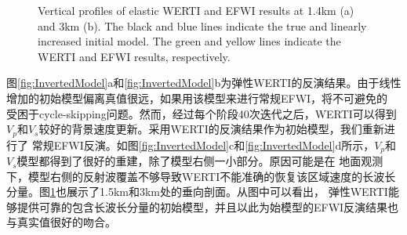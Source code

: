 \begin{figure}[!htb]
   \centering
   \caption{Vertical profiles of elastic WERTI and EFWI results at 1.4km (a) and
       3km (b). The black and blue lines indicate the true and linearly increased
       initial model. The green and yellow lines indicate the WERTI and EFWI results,
       respectively.
   }
   \label{fig:Profiles}
\end{figure}

图\ref{fig:InvertedModel}a和\ref{fig:InvertedModel}b为弹性WERTI的反演结果。由于线性增加的初始模型偏离真值很远，如果用该模型来进行常规EFWI，将不可避免的
受困于cycle-skipping问题。然而，经过每个阶段40次迭代之后，WERTI可以得到$V_p$和$V_s$较好的背景速度更新。采用WERTI的反演结果作为初始模型，我们重新进行了
常规EFWI反演。如图\ref{fig:InvertedModel}c和\ref{fig:InvertedModel}d所示，$V_p$和$V_s$模型都得到了很好的重建，除了模型右侧一小部分。原因可能是在
地面观测下，模型右侧的反射波覆盖不够导致WERTI不能准确的恢复该区域速度的长波长分量。图\ref{fig:Profiles}也展示了1.5km和3km处的垂向剖面。从图中可以看出，
弹性WERTI能够提供可靠的包含长波长分量的初始模型，并且以此为始模型的EFWI反演结果也与真实值很好的吻合。
